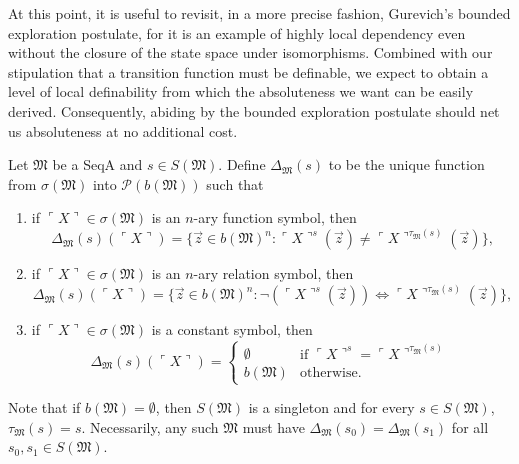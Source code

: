 \documentclass[12pt]{article}
\numberwithin{equation}{section}
\begin{document}
At this point, it is useful to revisit, in a more precise fashion, Gurevich's bounded exploration postulate, for it is an example of highly local dependency even without the closure of the state space under isomorphisms. Combined with our stipulation that a transition function must be definable, we expect to obtain a level of local definability from which the absoluteness we want can be easily derived. Consequently, abiding by the bounded exploration postulate should net us absoluteness at no additional cost.

\begin{defi}
Let $\mathfrak{M}$ be a SeqA and $s \in S(\mathfrak{M})$. Define $\Delta_{\mathfrak{M}}(s)$ to be the unique function from $\sigma(\mathfrak{M})$ into $\mathcal{P}(b(\mathfrak{M}))$ such that
\begin{enumerate}[label=(\alph*)]
    \item if $\ulcorner X \urcorner \in \sigma(\mathfrak{M})$ is an $n$-ary function symbol, then 
    \begin{equation*}
        \Delta_{\mathfrak{M}}(s)(\ulcorner X \urcorner) = \{\Vec{z} \in b(\mathfrak{M})^n : \ulcorner X \urcorner^{s}(\Vec{z}) \neq \ulcorner X \urcorner^{\tau_{\mathfrak{M}}(s)}(\Vec{z})\} \text{,}
    \end{equation*}
    \item if $\ulcorner X \urcorner \in \sigma(\mathfrak{M})$ is an $n$-ary relation symbol, then 
    \begin{equation*}
        \Delta_{\mathfrak{M}}(s)(\ulcorner X \urcorner) = \{\Vec{z} \in b(\mathfrak{M})^n : \neg (\ulcorner X \urcorner^{s}(\Vec{z})) \iff \ulcorner X \urcorner^{\tau_{\mathfrak{M}}(s)}(\Vec{z})\} \text{,}
    \end{equation*}
    \item if $\ulcorner X \urcorner \in \sigma(\mathfrak{M})$ is a constant symbol, then 
    \begin{equation*}
        \Delta_{\mathfrak{M}}(s)(\ulcorner X \urcorner) =
        \begin{cases}
            \emptyset & \text{if } \ulcorner X \urcorner^{s} = \ulcorner X \urcorner^{\tau_{\mathfrak{M}}(s)} \\
            b(\mathfrak{M}) & \text{otherwise.}
        \end{cases}
    \end{equation*}
\end{enumerate}
Note that if $b(\mathfrak{M}) = \emptyset$, then $S(\mathfrak{M})$ is a singleton and for every $s \in S(\mathfrak{M})$, $\tau_{\mathfrak{M}}(s) = s$. Necessarily, any such $\mathfrak{M}$ must have $\Delta_{\mathfrak{M}}(s_0) = \Delta_{\mathfrak{M}}(s_1)$ for all $s_0, s_1 \in S(\mathfrak{M})$.
\end{defi}
\end{document}
